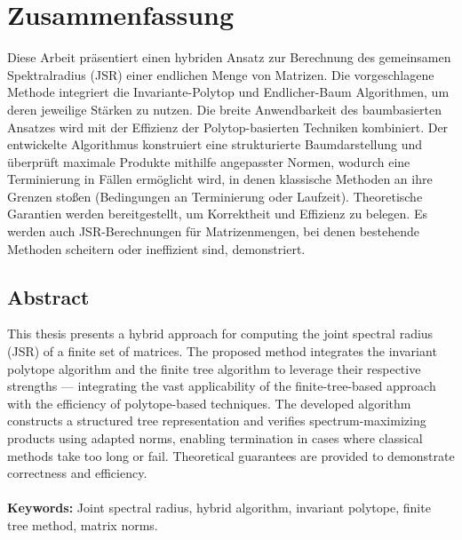 \chapter*{Zusammenfassung}

Diese Arbeit präsentiert einen hybriden Ansatz zur Berechnung des gemeinsamen Spektralradius (JSR) einer endlichen Menge von Matrizen. Die vorgeschlagene Methode integriert die Invariante-Polytop und Endlicher-Baum Algorithmen, um deren jeweilige Stärken zu nutzen. Die breite Anwendbarkeit des baumbasierten Ansatzes wird mit der Effizienz der Polytop-basierten Techniken kombiniert. Der entwickelte Algorithmus konstruiert eine strukturierte Baumdarstellung und überprüft maximale Produkte mithilfe angepasster Normen, wodurch eine Terminierung in Fällen ermöglicht wird, in denen klassische Methoden an ihre Grenzen stoßen (Bedingungen an Terminierung oder Laufzeit). Theoretische Garantien werden bereitgestellt, um Korrektheit und Effizienz zu belegen. Es werden auch JSR-Berechnungen für Matrizenmengen, bei denen bestehende Methoden scheitern oder ineffizient sind, demonstriert.

\vspace{1.3em} 					%
\section*{\huge Abstract} 	%
\vspace{1.3em} 					%

This thesis presents a hybrid approach for computing the joint spectral radius (JSR) of a finite set of matrices. The proposed method integrates the invariant polytope algorithm and the finite tree algorithm to leverage their respective strengths — integrating the vast applicability of the finite-tree-based approach with the efficiency of polytope-based techniques. The developed algorithm constructs a structured tree representation and verifies spectrum-maximizing products using adapted norms, enabling termination in cases where classical methods take too long or fail. Theoretical guarantees are provided to demonstrate correctness and efficiency. \\ \\
\textbf{Keywords:} Joint spectral radius, hybrid algorithm, invariant polytope, finite tree method, matrix norms.

